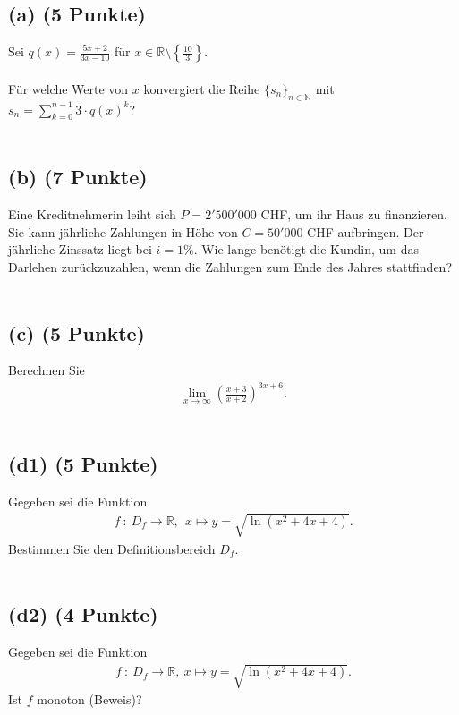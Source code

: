 \subsection*{(a) (5 Punkte)}
Sei $q(x) = \frac{5x+2}{3x-10}$ für $x \in \mathbb{R} \setminus \left\lbrace \frac{10}{3} \right\rbrace$.
\\
\\
Für welche Werte von $x$ konvergiert die Reihe $\lbrace s_n \rbrace_{n \in \mathbb{N}}$
mit $s_n = \sum_{k=0}^{n-1} 3 \cdot q(x)^k$?
\\
\\
\subsection*{(b) (7 Punkte)} 
Eine Kreditnehmerin leiht sich $P=2'500'000$ CHF, um ihr Haus zu finanzieren.
Sie kann jährliche Zahlungen in Höhe von $C=50'000$ CHF aufbringen.
Der jährliche Zinssatz liegt bei $i = 1 \%$. Wie lange benötigt die Kundin, um das Darlehen zurückzuzahlen, wenn die Zahlungen zum Ende des Jahres stattfinden? 
\\
\\
\subsection*{(c) (5 Punkte)}
Berechnen Sie 
\begin{align*}
\lim \limits_{x \rightarrow \infty} \left(\frac{x+3}{x+2}\right)^{3x+6}.
\end{align*}
\\

\subsection*{(d1) (5 Punkte)}
Gegeben sei die Funktion
\begin{align*}
f \ : \ D_f \to \mathbb{R}, \ \ x \mapsto y = \sqrt{\ln(x^2+4x+4)}.
\end{align*}
Bestimmen Sie den Definitionsbereich $D_f$.
\\
\\
\subsection*{(d2) (4 Punkte)}
Gegeben sei die Funktion
\begin{align*}
f \ : \ D_f \to \mathbb{R}, \ x \mapsto y = \sqrt{\ln(x^2 +4x +4)}. 
\end{align*}
Ist $f$ monoton (Beweis)?
\newpage
